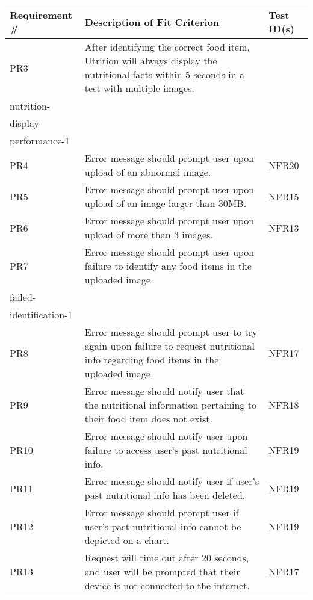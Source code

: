 \documentclass[12pt, titlepage]{article}
\begin{document}
	\begin{table}[H]
		\begin{tabularx}{\textwidth}{|l|X|l|}
			\hline
			{\bf Requirement \#} & {\bf Description of Fit Criterion} & {\bf Test ID(s)}\\
			\hline
			PR3 & After identifying the correct food item, Utrition will always 
			display the nutritional facts within 5 seconds in a test with 
			multiple images. & \begin{tabular}[c]{@{}l@{}}
				NFR11,\\nutrition-\\display-\\performance-1\end{tabular}\\
			\hline
			PR4 & Error message should prompt user upon upload of an abnormal 
			image. & NFR20\\
			\hline
			PR5 & Error message should prompt user upon upload of an image 
			larger than 30MB. & NFR15\\
			\hline
			PR6 & Error message should prompt user upon upload of more than 3 
			images. & NFR13\\
			\hline
			PR7 & Error message should prompt user upon failure to identify 
			any food items in the uploaded image. & 
			\begin{tabular}[c]{@{}l@{}}NFR16,\\failed-\\identification-1 
			\end{tabular}\\
			\hline
			PR8 & Error message should prompt user to try again upon failure 
			to request nutritional info regarding food items in the uploaded image. & NFR17\\
			\hline
			PR9 & Error message should notify user that the nutritional 
			information pertaining to their food item does not exist. & NFR18\\
			\hline
			PR10 & Error message should notify user upon failure to access 
			user's past nutritional info. & NFR19\\
			\hline
			PR11 & Error message should notify user if user's past nutritional 
			info has been deleted. & NFR19\\
			\hline
			PR12 & Error message should prompt user if user's past nutritional 
			info cannot be depicted on a chart. & NFR19\\
			\hline
			PR13 & Request will time out after 20 seconds, and user will be 
			prompted that their device is not connected to the internet. & NFR17\\
			\hline
		\end{tabularx}
	\end{table}
	
\end{document}
